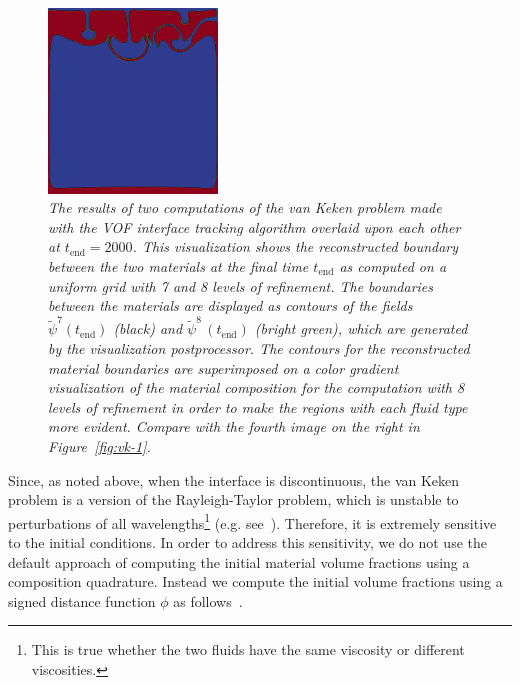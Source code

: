 \begin{figure}
    \centering
    \includegraphics[width=0.4\textwidth]{cookbooks/van-keken-vof/doc/vof_van_keken_refinement_comparison.png}
    \caption{\it The results of two computations of the van Keken problem made with the VOF 
        interface tracking algorithm overlaid upon each other at $t_\text{end}=2000$.
        This visualization shows the reconstructed boundary between the two
        materials at the final time $t_\text{end}$ as computed on a uniform grid
        with 7 and 8 levels of refinement.
        The boundaries between the materials are displayed as contours
        of the fields $\tilde{\psi}^7(t_\text{end})$ (black) and
        $\tilde{\psi}^8\,(t_\text{end})$ (bright green), which are generated by the  visualization postprocessor.
        The contours for the reconstructed material boundaries are superimposed
        on a color gradient visualization of the material composition for the
        computation with 8 levels of refinement in order to make the regions
        with each fluid type more evident.
        Compare with the fourth image on the right in Figure~\ref{fig:vk-1}.
    }
    \label{fig:VOF_van_Keken-02}
\end{figure}

Since, as noted above, when the interface is discontinuous, the van Keken problem is a version 
of the Rayleigh-Taylor problem, which is unstable to perturbations of all 
wavelengths\footnote{This is true whether the two fluids have the same viscosity or different 
viscosities.} (e.g. see~\cite{SC:1961}).
Therefore, it is extremely sensitive to the initial conditions.
In order to address this sensitivity, we do not use  the default approach of
computing the initial material volume fractions using a composition quadrature.
Instead we compute the initial volume fractions using a signed distance
function $\phi$ as follows~\cite{JMR:2019,JMR-EGP:2019}.

